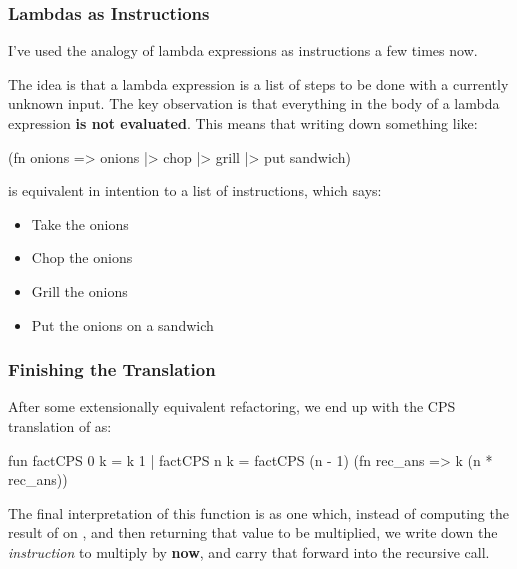 \documentclass[aspectratio=169]{beamer}
\begin{document}
\begin{frame}[fragile]
  \frametitle{Lambdas as Instructions}

  I've used the analogy of lambda expressions as instructions a few times now.

  \pause
  \vspace{\fill}

  The idea is that a lambda expression is a list of steps to be done with a
  currently unknown input. The key observation is that everything in the body
  of a lambda expression \textbf{is not evaluated}. This means that writing
  down something like:

  \begin{codeblock}
    (fn onions => onions |> chop |> grill |> put sandwich)
  \end{codeblock}

  is equivalent in intention to a list of instructions, which says:
  \begin{itemize}
    \item Take the onions
    \item Chop the onions
    \item Grill the onions
    \item Put the onions on a sandwich
  \end{itemize}
\end{frame}

\begin{frame}[fragile]
  \frametitle{Finishing the Translation}

  After some extensionally equivalent refactoring, we end up with the
  CPS translation of  as:

  \begin{codeblock}
    fun factCPS 0 k = k 1
      | factCPS n k =
          factCPS (n - 1) (fn rec_ans => k (n * rec_ans))
  \end{codeblock}

  \pause
  \vspace{\fill}

  The final interpretation of this function is as one which, instead of
  computing the result of  on , and then returning
  that value to be multiplied, we write down the \textit{instruction} to
  multiply by  \textbf{now}, and carry that forward into the
  recursive call.
\end{frame}
\end{document}
